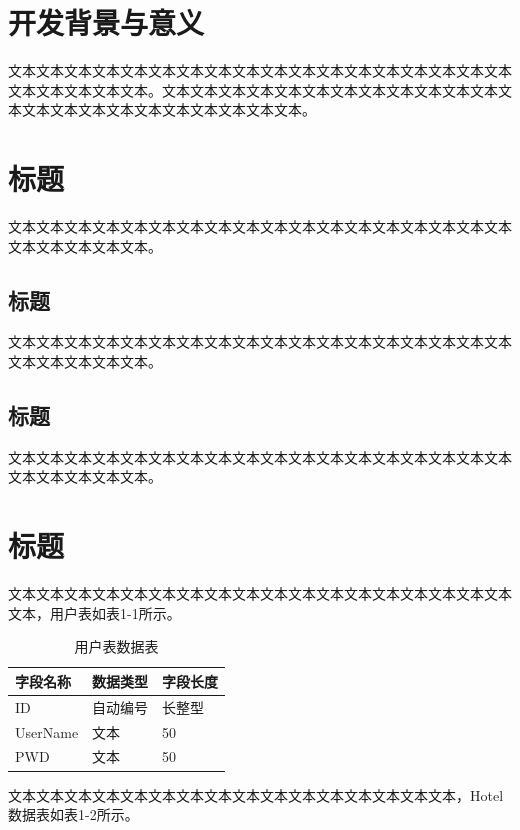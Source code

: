 \documentclass{suse-cs-thesis}
\begin{document}
\section{开发背景与意义}

文本文本文本文本文本文本文本文本文本文本文本文本文本文本文本文本文本文本文本文本文本文本文本。文本文本文本文本文本文本文本文本文本文本文本文本文本文本文本文本文本文本文本文本文本文本文本。

\section{标题}

文本文本文本文本文本文本文本文本文本文本文本文本文本文本文本文本文本文本文本文本文本文本文本。

\subsection{标题}

文本文本文本文本文本文本文本文本文本文本文本文本文本文本文本文本文本文本文本文本文本文本文本。

\subsection{标题}

文本文本文本文本文本文本文本文本文本文本文本文本文本文本文本文本文本文本文本文本文本文本文本。

\section{标题}

文本文本文本文本文本文本文本文本文本文本文本文本文本文本文本文本文本文本文本，用户表如表1-1所示。

\begin{table}[htbp]
    \centering
    \caption{用户表数据表}
    \label{tab:user}
    \begin{tabular}{lll}
        \toprule
        字段名称 & 数据类型 & 字段长度 \\
        \midrule
        ID & 自动编号 & 长整型 \\
        UserName & 文本 & 50 \\
        PWD & 文本 & 50 \\
        \bottomrule
    \end{tabular}
\end{table}

文本文本文本文本文本文本文本文本文本文本文本文本文本文本文本文本，Hotel数据表如表1-2所示。
\end{document}

